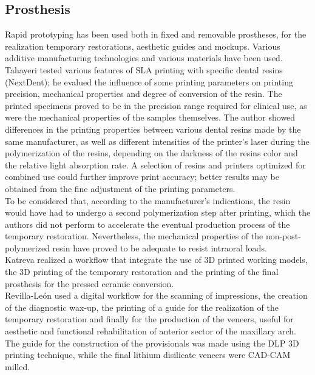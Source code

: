 \subsection{Prosthesis}
Rapid prototyping has been used both in fixed and removable prostheses, for the realization temporary restorations, aesthetic guides and mockups. Various additive manufacturing technologies and various materials have been used. \\
Tahayeri \parencite{Reference98} tested various features of SLA printing with specific dental resins (NextDent); he evalued the influence of some printing parameters on printing precision, mechanical properties and degree of conversion of the resin. The printed specimens proved to be in the precision range required for clinical use, as were the mechanical properties of the samples themselves. The author showed differences in the printing properties between various dental resins made by the same manufacturer, as well as different intensities of the printer's laser during the polymerization of the resins, depending on the darkness of the resins color and the relative light absorption rate. A selection of resins and printers optimized for combined use could further improve print accuracy; better results may be obtained from the fine adjustment of the printing parameters. \\
To be considered that, according to the manufacturer's indications, the resin would have had to undergo a second polymerization step after printing, which the authors did not perform to accelerate the eventual production process of the temporary restoration. Nevertheless, the mechanical properties of the non-post-polymerized resin have proved to be adequate to resist intraoral loads. \\
Katreva \parencite{Reference99} realized a workflow that integrate the use of 3D printed working models, the 3D printing of the temporary restoration and the printing of the final prosthesis for the pressed ceramic conversion. \\
Revilla-León \parencite{Reference100} used a digital workflow for the scanning of impressions, the creation of the diagnostic wax-up, the printing of a guide for the realization of the temporary restoration and finally for the production of the veneers, useful for aesthetic and functional rehabilitation of anterior sector of the maxillary arch. The guide for the construction of the provisionals was made using the DLP 3D printing technique, while the final lithium disilicate veneers were CAD-CAM milled. \\
